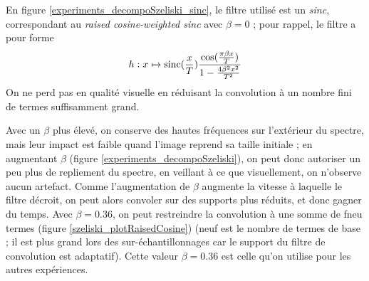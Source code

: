 	En figure \ref{experiments_decompoSzeliski_sinc}, le filtre utilisé est un \emph{sinc}, correspondant au \emph{raised cosine-weighted sinc} avec $\beta = 0$ ; pour rappel, le filtre a pour forme
	\[h : x \mapsto \operatorname{sinc}(\frac{x}{T})\frac{\cos(\frac{\pi\beta x}{T})}{1-\frac{4\beta^2x^2}{T^2}}\]
	On ne perd pas en qualité visuelle en réduisant la convolution à un nombre fini de termes suffisamment grand.
	
	Avec un $\beta$ plus élevé, on conserve des hautes fréquences sur l'extérieur du spectre, mais leur impact est faible quand l'image reprend sa taille initiale ; en augmentant $\beta$ (figure \ref{experiments_decompoSzeliski}), on peut donc autoriser un peu plus de repliement du spectre, en veillant à ce que visuellement, on n'observe aucun artefact. Comme l'augmentation de $\beta$ augmente la vitesse à laquelle le filtre décroit, on peut alors convoler sur des supports plus réduits, et donc gagner du temps. Avec $\beta = 0.36$, on peut restreindre la convolution à une somme de fneu termes (figure \ref{szeliski_plotRaisedCosine}) (neuf est le nombre de termes de base ; il est plus grand lors des sur-échantillonnages car le support du filtre de convolution est adaptatif). Cette valeur $\beta = 0.36$ est celle qu'on utilise pour les autres expériences.
 
